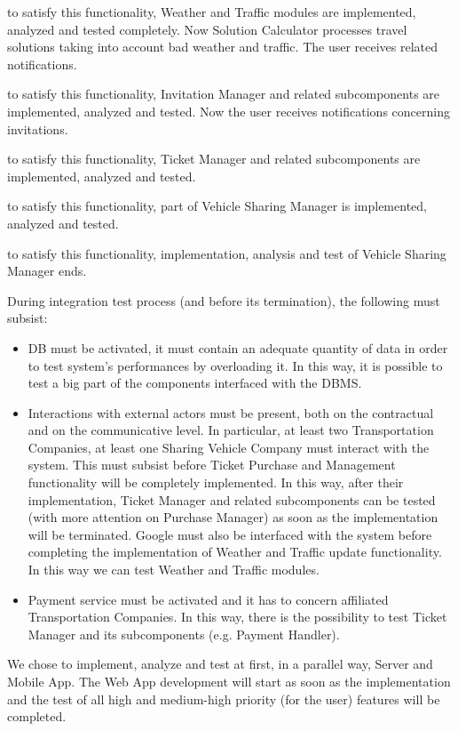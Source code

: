 \begin{description}[before={\renewcommand{\makelabel}[1]{ \textbf{\textit{##1}}:}}]
	\item[8. Wheather \& traffic updates] to satisfy this functionality, Weather and Traffic modules are implemented, analyzed and tested completely. Now Solution Calculator processes travel solutions taking into account bad weather and traffic. The user receives related notifications.
	\item[9. Invitations] to satisfy this functionality, Invitation Manager and related subcomponents are implemented, analyzed and tested. Now the user receives notifications concerning invitations.
	\item[10. Ticket purchase and management] to satisfy this functionality, Ticket Manager and related subcomponents are implemented, analyzed and tested.
	\item[11. Rent a sharing vehicle] to satisfy this functionality, part of Vehicle Sharing Manager is implemented, analyzed and tested.
	\item[12. Localization sharing vehicle] to satisfy this functionality, implementation, analysis and test of Vehicle Sharing Manager ends.\newline		
\end{description} \bigskip
\noindent
During integration test process (and before its termination), the following must subsist:
\begin{itemize}
	\item DB must be activated, it must contain an adequate quantity of data in order to test system's performances by overloading it. In this way, it is possible to test a big part of the components interfaced with the DBMS.
	\item Interactions with external actors must be present, both on the contractual and on the communicative level. In particular, at least two Transportation Companies, at least one Sharing Vehicle Company must interact with the system. This must subsist before Ticket Purchase and Management functionality will be completely implemented.  In this way, after their implementation, Ticket Manager and related subcomponents can be tested (with more attention on Purchase Manager) as soon as the implementation will be terminated. 
	Google must also be interfaced with the system before completing the implementation of Weather and Traffic update functionality. In this way we can test Weather and Traffic modules. 
	\item Payment service must be activated and it has to concern affiliated Transportation Companies. In this way, there is the possibility to test Ticket Manager and its subcomponents (e.g. Payment Handler). \newline	
\end{itemize} 
\bigskip 
We chose to implement, analyze and test at first, in a parallel way, Server and Mobile App. The Web App development will start as soon as the implementation and the test of all high and medium-high priority (for the user) features will be completed.